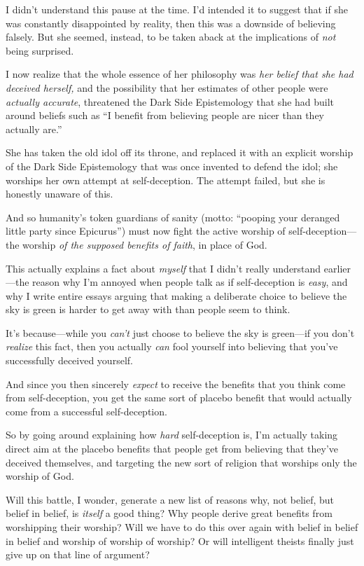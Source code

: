 {
 I didn't understand this pause at the time.
I'd intended it to suggest that if she was constantly
disappointed by reality, then this was a downside of believing falsely.
But she seemed, instead, to be taken aback at the implications of
\textit{not} being surprised.}

{
 I now realize that the whole essence of her philosophy was
\textit{her belief that she had deceived herself,} and the possibility
that her estimates of other people were \textit{actually accurate},
threatened the Dark Side Epistemology that she had built around beliefs
such as ``I benefit from believing people are nicer
than they actually are.''}

{
 She has taken the old idol off its throne, and replaced it with an
explicit worship of the Dark Side Epistemology that was once invented
to defend the idol; she worships her own attempt at self-deception. The
attempt failed, but she is honestly unaware of this.}

{
 And so humanity's token guardians of sanity
(motto: ``pooping your deranged little party since
Epicurus'') must now fight the active worship of
self-deception---the worship \textit{of the supposed benefits of
faith}, in place of God.}

{
 This actually explains a fact about \textit{myself} that I
didn't really understand earlier---the reason why
I'm annoyed when people talk as if self-deception is
\textit{easy}, and why I write entire essays arguing that making a
deliberate choice to believe the sky is green is harder to get away
with than people seem to think.}

{
 It's because---while you
\textit{can't} just choose to believe the sky is
green---if you don't \textit{realize} this fact, then
you actually \textit{can} fool yourself into believing that
you've successfully deceived yourself.}

{
 And since you then sincerely \textit{expect} to receive the
benefits that you think come from self-deception, you get the same sort
of placebo benefit that would actually come from a successful
self-deception.}

{
 So by going around explaining how \textit{hard} self-deception is,
I'm actually taking direct aim at the placebo benefits
that people get from believing that they've deceived
themselves, and targeting the new sort of religion that worships only
the worship of God.}

{
 Will this battle, I wonder, generate a new list of reasons why,
not belief, but belief in belief, is \textit{itself} a good thing? Why
people derive great benefits from worshipping their worship? Will we
have to do this over again with belief in belief in belief and worship
of worship of worship? Or will intelligent theists finally just give up
on that line of argument?}

